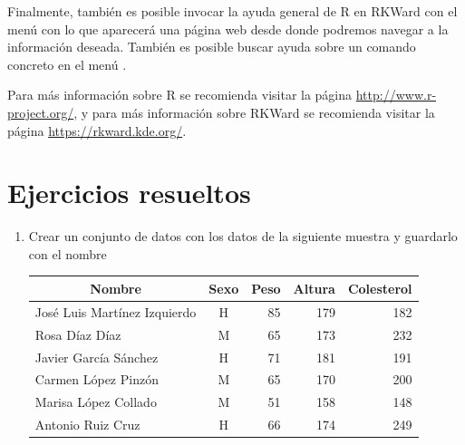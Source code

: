Finalmente, también es posible invocar la ayuda general de R en RKWard con el menú  con lo
que aparecerá una página web desde donde podremos navegar a la información deseada. También es posible buscar ayuda
sobre un comando concreto en el menú .

Para más información sobre R se recomienda visitar la página \url{http://www.r-project.org/}, y para más información
sobre RKWard se recomienda visitar la página \url{https://rkward.kde.org/}. 

\clearpage
\newpage

\section{Ejercicios resueltos}
\begin{enumerate}[leftmargin=*]
\item Crear un conjunto de datos con los datos de la siguiente muestra y guardarlo con el nombre
\begin{center}
\begin{tabular}{|l|c|r|r|r|}
\hline
\multicolumn{1}{|c|}{Nombre} & \multicolumn{1}{c|}{Sexo} & \multicolumn{1}{c|}{Peso} & \multicolumn{1}{c|}{Altura} & \multicolumn{1}{c|}{Colesterol}\\
\hline
José Luis Martínez Izquierdo  & H &  85 & 179 & 182\\
Rosa Díaz Díaz & M & 65 & 173 & 232\\
Javier García Sánchez  & H & 71 & 181 & 191\\
Carmen López Pinzón & M &  65 & 170 & 200\\
Marisa López Collado & M &  51 & 158 & 148\\
Antonio Ruiz Cruz & H & 66 & 174 & 249\\
\hline
\end{tabular}
\end{center}


\end{enumerate}
